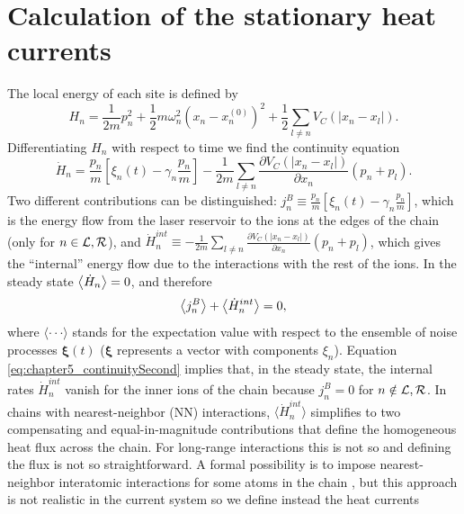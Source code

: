 \section{Calculation of the stationary heat currents\label{sec:chapter5_HeatFlow}}
%
%
The local energy of each site is defined by
%
\begin{equation}
    H_n = \frac{1}{2m} p_n^2 + \frac{1}{2}m\omega_n^2 \left( x_n - x_n^{(0)}\right)^2 +\frac{1}{2}\sum_{l\neq n} V_C(\left|x_n-x_l\right|).
    \label{eq:chapter5_LocalEnergy}
\end{equation}
%
Differentiating $H_n$ with respect to time we find the continuity  equation
%
\begin{equation}
    \dot{H}_n = \frac{p_n}{m}\! \left[ \xi_n(t)-\gamma_n \frac{p_n}{m} \right]\! - \frac{1}{2m}\!\sum_{l\neq n}\frac{\partial V_C (\left|x_n\!-\!x_l\right|)}{\partial x_n}(p_n + p_l).
    \label{eq:chapter5_continuityFirst}
\end{equation}
%
Two different contributions can be distinguished: $j^B_n \equiv \frac{p_n}{m} \left[ \xi_n(t)-\gamma_n \frac{p_n}{m} \right]$, which is the energy flow from the laser reservoir to the ions at the edges of the chain (only for $n\in {\cal L}, {\cal R}$), and $\dot{H}_n^{int} \equiv - \frac{1}{2m}\sum_{l\neq n}\frac{\partial V_C (\left|x_n-x_l\right|)}{\partial x_n}(p_n + p_l)$, which gives the ``internal'' energy flow due to the interactions with the rest of the ions. In the steady state $\expval{\dot{H}_n} = 0$, and therefore
%
\begin{equation}
    \expval{j^B_n} + \expval{\dot{H}_n^{int}} = 0,
    \label{eq:chapter5_continuitySecond}
\end{equation}
%
where $\langle \cdot\!\cdot\!\cdot \rangle$ stands for the expectation value with respect to  the ensemble of noise processes $\bm\xi (t)$ ($\bm\xi$ represents a vector with
components $\xi_n$). Equation \eqref{eq:chapter5_continuitySecond} implies that, in the steady state, the internal rates $\dot{H}_n^{int}$ vanish for the inner ions of the chain because $j^B_n = 0$ for $n\notin {\cal L},{\cal R}$. In chains with nearest-neighbor (NN) interactions,
$\langle\dot{H}_n^{int}\rangle$ simplifies to two compensating and equal-in-magnitude contributions that define the homogeneous heat flux across the chain.
For long-range interactions this is not so and defining the flux is not so straightforward. A formal possibility is to impose
nearest-neighbor interatomic interactions for some atoms in the chain \cite{Chen2015},
but this approach is not realistic in the current system so we define instead the heat currents
